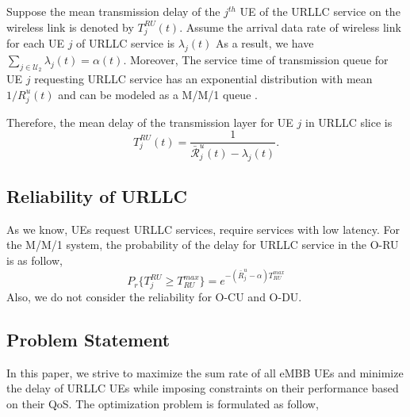 \documentclass[conference]{IEEEtran}
\begin{document}
Suppose the mean transmission delay of the $j^{th}$ UE of the URLLC service on the wireless link is denoted by
$T_{j}^{RU}(t)$.
 Assume the arrival data rate of wireless link for each UE $j$ of URLLC service is $\lambda_j(t)$
As a result, we have $\sum_{j \in \mathcal{U}_2} \lambda_{j}(t) = \alpha(t)$.
Moreover, The service time of transmission queue for UE $j$ requesting URLLC service has
an exponential distribution with mean $1/R_{j}^u(t)$ and can be modeled as a M/M/1 queue \cite{SystemCostMinimization,luong2018joint,luong2018novel}.
 
Therefore, the mean delay of the transmission layer for UE $j$ in URLLC slice is
\begin{equation}
 T_{j}^{RU}(t) = \frac{1}{\bar{\mathcal{R}}_{j}^u(t) - \lambda_{j}(t)}.
\end{equation}


\subsection{Reliability of URLLC}
As we know, UEs request URLLC services, require services with low latency.
For the M/M/1 system, the probability of the delay for URLLC service in the O-RU is as follow, 
\begin{equation}
P_r\{T_{j}^{RU} \geq T_{RU}^{max}\} = e^{-(\bar{R}_{j}^u - \alpha)T_{RU}^{max}}
\end{equation} 
Also, we do not consider the reliability for O-CU and O-DU.

\subsection{Problem Statement}
In this paper, we strive to maximize the sum rate of all eMBB UEs and minimize the delay of URLLC UEs while imposing constraints on their performance based on their QoS.
The optimization problem is formulated as follow,
\end{document}
